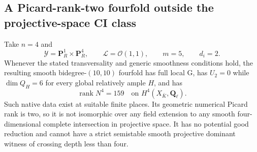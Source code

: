 \subsection{A Picard-rank-two fourfold outside the projective-space CI class}

\begin{corollary}
\label{r18pg:product-example}
Take $n=4$ and
\[
      \mathcal Y=\mathbf P^1_R\times\mathbf P^4_R,
              \qquad\mathcal L=\mathcal O(1,1),
              \qquad m=5,\qquad d_i=2.
 \tag{PG18.20}\label{r18pg:product-data}
\]
Whenever the stated transversality and generic smoothness conditions
hold, the resulting smooth bidegree-$(10,10)$ fourfold has full local
G, has $U_2=0$ while $\dim Q_H=6$ for every global relatively ample
$H$, and has
\[
                    \operatorname{rank}N^4=159
               \quad\text{on }H^4(X_{\bar K},\mathbf Q_\ell).
 \tag{PG18.21}\label{r18pg:monodromy-example}
\]
Such native data exist at suitable finite places.  Its geometric
numerical Picard rank is two, so it is not isomorphic over any
field extension to any smooth four-dimensional complete intersection
in projective space.  It has no potential good reduction and cannot
have a strict semistable smooth projective dominant witness of
crossing depth less than four.
\end{corollary}

